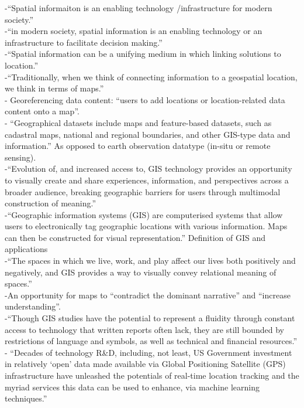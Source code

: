 -{\color{orange}“Spatial informaiton is an enabling technology /infrastructure for modern society.”}\cite{Rajabifard2009}\\
-{\color{orange}“in modern society, spatial information is an enabling technology or an infrastructure to facilitate decision making.”}\cite{Rajabifard2009}\\
-{\color{orange}“Spatial information can be a unifying medium in which linking solutions to location.”}\cite{Rajabifard2009}\\
-{\color{orange}“Traditionally, when we think of connecting information to a geospatial location, we think in terms of maps.”}\cite{Xing2015}\\
-{\color{orange} Georeferencing data content: “users to add locations or location-related data content onto a map”.}\cite{Xing2015}\\
-{\color{orange} “Geographical datasets include maps and feature-based datasets, such as cadastral maps, national and regional boundaries, and other GIS-type data and information.” As opposed to earth observation datatype (in-situ or remote sensing). \cite{Jiang2020}}\\
-{\color{orange}“Evolution of, and increased access to, GIS technology provides an opportunity to visually create and share experiences, information, and perspectives across a broader audience, breaking geographic barriers for users through multimodal construction of meaning.”\cite{McQueenBaker2019}}\\
-{\color{orange}“Geographic information systems (GIS) are computerised systems that allow users to electronically tag geographic locations with various information. Maps can then be constructed for visual representation.” Definition of GIS and applications\cite{McQueenBaker2019}}\\
-{\color{orange}“The spaces in which we live, work, and play affect our lives both positively and negatively, and GIS provides a way to visually convey relational meaning of spaces.'' \cite{McQueenBaker2019}}\\
-{\color{orange}An opportunity for maps to “contradict the dominant narrative” and “increase understanding”.\cite{McQueenBaker2019}}\\
-{\color{orange}“Though GIS studies have the potential to represent a fluidity through constant access to technology that written reports often lack, they are still bounded by restrictions of language and symbols, as well as technical and financial resources.”\cite{McQueenBaker2019}}\\
-{\color{orange} “Decades of technology R\&D, including, not least, US Government investment in relatively ‘open’ data made available via Global Positioning Satellite (GPS) infrastructure have unleashed the potentials of real-time location tracking and the myriad services this data can be used to enhance, via machine learning techniques.”\cite{Barns2020}}\\

